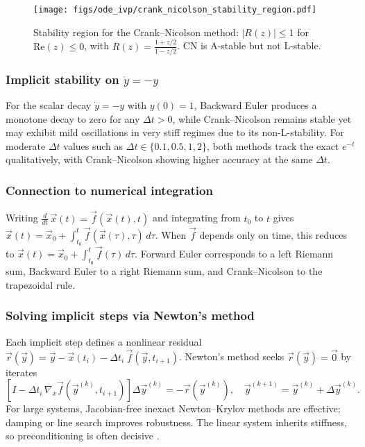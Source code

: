 \begin{figure}[h!]
    \centering
    \texttt{[image: figs/ode\_ivp/crank\_nicolson\_stability\_region.pdf]}
    \caption{Stability region for the Crank--Nicolson method: $|R(z)|\le 1$ for $\mathrm{Re}(z)\le 0$, with $R(z)=\tfrac{1+z/2}{1-z/2}$. CN is A-stable but not L-stable.}
    \label{fig:cn-stability}
\end{figure}

\subsubsection{Implicit stability on $\dot{y}=-y$}
For the scalar decay $\dot{y}=-y$ with $y(0)=1$, Backward Euler produces a monotone decay to zero for any $\Delta t>0$, while Crank--Nicolson remains stable yet may exhibit mild oscillations in very stiff regimes due to its non-L-stability. For moderate $\Delta t$ values such as $\Delta t\in\{0.1,0.5,1,2\}$, both methods track the exact $e^{-t}$ qualitatively, with Crank--Nicolson showing higher accuracy at the same $\Delta t$.

\subsubsection{Connection to numerical integration}
Writing $\tfrac{d}{dt}\,\vec{x}(t)=\vec{f}(\vec{x}(t),t)$ and integrating from $t_0$ to $t$ gives $\vec{x}(t)=\vec{x}_0+\int_{t_0}^{t}\vec{f}(\vec{x}(\tau),\tau)\,d\tau$. When $\vec{f}$ depends only on time, this reduces to $\vec{x}(t)=\vec{x}_0+\int_{t_0}^{t}\vec{f}(\tau)\,d\tau$. Forward Euler corresponds to a left Riemann sum, Backward Euler to a right Riemann sum, and Crank--Nicolson to the trapezoidal rule.

\subsubsection{Solving implicit steps via Newton's method}
Each implicit step defines a nonlinear residual $\vec{r}(\vec{y}) = \vec{y} - \vec{x}(t_i) - \Delta t_i\,\vec{f}(\vec{y}, t_{i+1})$. Newton's method seeks $\vec{r}(\vec{y})=\vec{0}$ by iterates
\begin{equation}
    \left[I - \Delta t_i\,\nabla_{\!x} \vec{f}(\vec{y}^{(k)}, t_{i+1})\right] \Delta \vec{y}^{(k)} = -\vec{r}(\vec{y}^{(k)}),\quad \vec{y}^{(k+1)}=\vec{y}^{(k)}+\Delta \vec{y}^{(k)}.
\end{equation}
For large systems, Jacobian-free inexact Newton--Krylov methods are effective; damping or line search improves robustness. The linear system inherits stiffness, so preconditioning is often decisive \cite{HairerWannerII,Hindmarsh2005SUNDIALS}.


